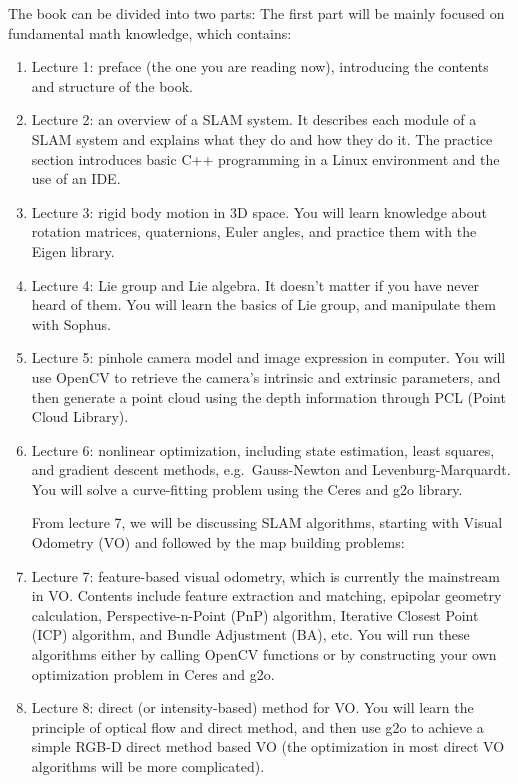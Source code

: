The book can be divided into two parts: The first part will be mainly focused on fundamental math knowledge, which contains:
\begin{enumerate}
	\item Lecture 1: preface (the one you are reading now), introducing the contents and structure of the book.
	\item Lecture 2: an overview of a SLAM system. It describes each module of a SLAM system and explains what they do and how they do it. The practice section introduces basic C++ programming in a Linux environment and the use of an IDE\@.
	\item Lecture 3: rigid body motion in 3D space. You will learn knowledge about rotation matrices, quaternions, Euler angles, and practice them with the Eigen library.
	\item Lecture 4: Lie group and Lie algebra. It doesn't matter if you have never heard of them. You will learn the basics of Lie group, and manipulate them with Sophus.
	\item Lecture 5: pinhole camera model and image expression in computer. You will use OpenCV to retrieve the camera's intrinsic and extrinsic parameters, and then generate a point cloud using the depth information through PCL (Point Cloud Library).
	\item Lecture 6: nonlinear optimization, including state estimation, least squares, and gradient descent methods, e.g.\ Gauss-Newton and Levenburg-Marquardt. You will solve a curve-fitting problem using the Ceres and g2o library.
	
	From lecture 7, we will be discussing SLAM algorithms, starting with Visual Odometry (VO) and followed by the map building problems: 
	
	\item Lecture 7: feature-based visual odometry, which is currently the mainstream in VO. Contents include feature extraction and matching, epipolar geometry calculation, Perspective-n-Point (PnP) algorithm, Iterative Closest Point (ICP) algorithm, and Bundle Adjustment (BA), etc. You will run these algorithms either by calling OpenCV functions or by constructing your own optimization problem in Ceres and g2o.
	
	\item Lecture 8: direct (or intensity-based) method for VO. You will learn the principle of optical flow and direct method, and then use g2o to achieve a simple RGB-D direct method based VO (the optimization in most direct VO algorithms will be more complicated).
	

\end{enumerate}
